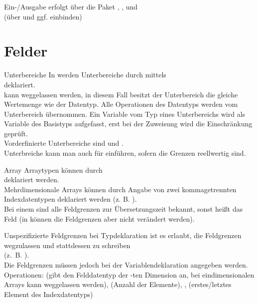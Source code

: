 \begin{Def}{Ein-/Ausgabe}
    erfolgt über die Paket ,
    , und \\
    (über  und ggf.  einbinden)
\end{Def}

\pagebreak

\section{%
    Felder%
}

\begin{Def}{Unterbereiche}
    In \Ada{} werden Unterbereiche durch  mittels \\
    deklariert. \\
     kann weggelassen werden, in diesem Fall
    besitzt der Unterbereich die gleiche Wertemenge wie der Datentyp.
    Alle Operationen des Datentyps werden vom Unterbereich übernommen.
    Ein Variable vom Typ eines Unterbereichs wird als Variable des Basistyps
    aufgefasst, erst bei der Zuweisung wird die Einschränkung geprüft. \\
    Vorderfinierte Unterbereiche sind  und
    . \\
    Unterbreiche kann man auch für  einführen, sofern die
    Grenzen reellwertig sind.
\end{Def}

\begin{Def}{Array}
    Arraytypen können durch \\
    deklariert werden. \\
    Mehrdimensionale Arrays können durch Angabe von zwei kommagetrennten
    Indexdatentypen deklariert werden (z. B.
    ). \\
    Bei einem  sind alle Feldgrenzen zur
    Übersetzungszeit bekannt, sonst heißt das Feld 
    (in \Ada{} können die Feldgrenzen aber nicht verändert werden).
\end{Def}

\begin{Def}{Unspezifizierte Feldgrenzen}
    bei Typdeklaration ist es erlaubt, die Feldgrenzen wegzulassen und
    stattdessen  zu schreiben \\
    (z.~B. ). \\
    Die Feldgrenzen müssen jedoch bei der Variablendeklaration angegeben
    werden.
    Operationen:  (gibt den Felddatentyp der
    -ten Dimension an, bei eindimensionalen Arrays kann
     weggelassen werden),  (Anzahl der
    Elemente), ,  (erstes/letztes
    Element des Indexdatentyps)
\end{Def}


